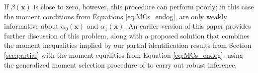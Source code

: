 If $\beta(\mathbf{x})$ is close to zero, however, this procedure can perform poorly; in this case the moment conditions from Equations \ref{eq:MCs_endog}, are only weakly informative about $\alpha_0(\mathbf{x})$ and $\alpha_1(\mathbf{x})$.
An earlier version of this paper \citep{DiTragliaGarciaWP2017} provides further discussion of this problem, along with a proposed solution that combines the moment inequalities implied by our partial identification results from Section \ref{sec:partial} with the moment equalities from Equation \ref{eq:MCs_endog}, using the generalized moment selection procedure of \cite{AndrewsSoares} to carry out robust inference.
